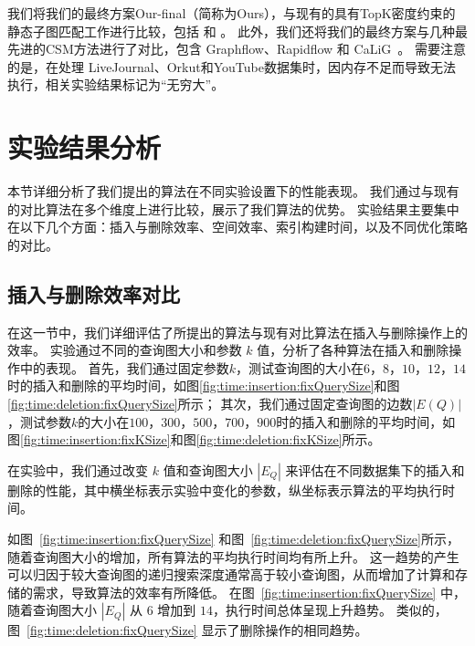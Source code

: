 我们将我们的最终方案Our-final（简称为Ours），与现有的具有TopK密度约束的静态子图匹配工作进行比较，包括 \itk\cite{static-topk-Gupta-DBLP:conf/icde/GuptaGYCH14} 和 \pm\cite{static-topk-Chen-DBLP:journals/ijprai/ChenLCTL18}。
此外，我们还将我们的最终方案与几种最先进的CSM方法进行了对比，包含 Graphflow\cite{csm-graphflow-DBLP:conf/sigmod/KankanamgeSMCS17}、Rapidflow\cite{csm-rapidflow-DBLP:journals/pvldb/SunSHL22} 和 CaLiG~\cite{csm-calig-DBLP:journals/pacmmod/YangZZY23}。
需要注意的是，\itk 在处理 LiveJournal、Orkut和YouTube数据集时，因内存不足而导致无法执行，相关实验结果标记为“无穷大”。

\section{实验结果分析}
\label{ch5:overall-compare}
本节详细分析了我们提出的算法在不同实验设置下的性能表现。
我们通过与现有的对比算法在多个维度上进行比较，展示了我们算法的优势。
实验结果主要集中在以下几个方面：插入与删除效率、空间效率、索引构建时间，以及不同优化策略的对比。
\subsection{插入与删除效率对比}
\label{ch5:insertion-deletion}
在这一节中，我们详细评估了所提出的算法与现有对比算法在插入与删除操作上的效率。
实验通过不同的查询图大小和参数 $k$ 值，分析了各种算法在插入和删除操作中的表现。
首先，我们通过固定参数$k$，测试查询图的大小在$6$，$8$，$10$，$12$，$14$时的插入和删除的平均时间，如图\ref{fig:time:insertion:fixQuerySize}和图\ref{fig:time:deletion:fixQuerySize}所示；
其次，我们通过固定查询图的边数$|E(Q)|$，测试参数$k$的大小在$100$，$300$，$500$，$700$，$900$时的插入和删除的平均时间，如图\ref{fig:time:insertion:fixKSize}和图\ref{fig:time:deletion:fixKSize}所示。






在实验中，我们通过改变 $k$ 值和查询图大小 $|E_Q|$ 来评估在不同数据集下的插入和删除的性能，其中横坐标表示实验中变化的参数，纵坐标表示算法的平均执行时间。



如图~\ref{fig:time:insertion:fixQuerySize} 和图~\ref{fig:time:deletion:fixQuerySize}所示，随着查询图大小的增加，所有算法的平均执行时间均有所上升。
这一趋势的产生可以归因于较大查询图的递归搜索深度通常高于较小查询图，从而增加了计算和存储的需求，导致算法的效率有所降低。
在图~\ref{fig:time:insertion:fixQuerySize} 中，随着查询图大小 $|E_Q|$ 从 $6$ 增加到 $14$，执行时间总体呈现上升趋势。
类似的，图~\ref{fig:time:deletion:fixQuerySize} 显示了删除操作的相同趋势。

